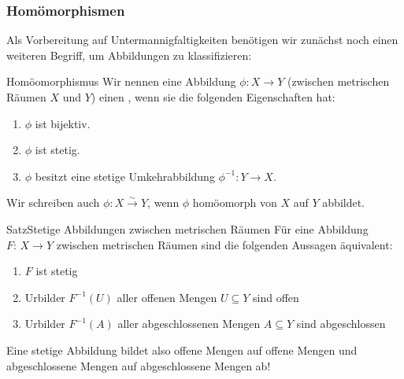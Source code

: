 \subsubsection{Homömorphismen}
Als Vorbereitung auf Untermannigfaltigkeiten benötigen wir zunächst noch einen weiteren Begriff, um Abbildungen zu klassifizieren:
\begin{Def}
{Homöomorphismus}
Wir nennen eine Abbildung $\phi:X\to Y$ (zwischen metrischen Räumen $X$ und $Y$) einen , wenn sie die folgenden Eigenschaften hat:
\begin{enumerate}
    \item $\phi$ ist bijektiv.
    \item $\phi$ ist stetig.
    \item $\phi$ besitzt eine stetige Umkehrabbildung $\phi^{-1}:Y\to X$.
\end{enumerate}
Wir schreiben auch $\phi:X\overset{\sim}{\to}Y$, wenn $\phi$ homöomorph von $X$ auf $Y$ abbildet.
\end{Def}
\begin{Satz}
    {Satz}{Stetige Abbildungen zwischen metrischen Räumen}
    Für eine Abbildung $F:\,X\rightarrow Y$ zwischen metrischen Räumen sind die folgenden Aussagen äquivalent:
    \begin{enumerate}
        \item $F$ ist stetig
        \item Urbilder $F^{-1}(U)$ aller offenen Mengen $U\subseteq Y$ sind offen
        \item Urbilder $F^{-1}(A)$ aller abgeschlossenen Mengen $A\subseteq Y$ sind abgeschlossen
    \end{enumerate}
    Eine stetige Abbildung bildet also offene Mengen auf offene Mengen und abgeschlossene Mengen auf abgeschlossene Mengen ab!
\end{Satz}
